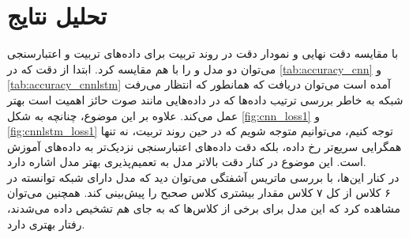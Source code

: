 \documentclass[11pt]{article}
\begin{document}
	\section{تحلیل نتایج}
	با مقایسه دقت نهایی و نمودار دقت در روند تربیت برای داده‌های تربیت و اعتبارسنجی می‌توان دو مدل  و  را با هم مقایسه کرد. ابتدا از دقت که در 
	\autoref{tab:accuracy_cnn}
	و 
	\autoref{tab:accuracy_cnnlstm}
	آمده است می‌توان دریافت که همانطور که انتظار می‌رفت شبکه 
	به خاطر بررسی ترتیب داده‌ها که در داده‌هایی مانند صوت حائز اهمیت است بهتر عمل می‌کند. علاوه بر این موضوع، چنانچه به شکل‌
	\autoref{fig:cnn_loss1}
	و 
	\autoref{fig:cnnlstm_loss1}
	توجه کنیم، می‌توانیم متوجه شویم که در حین روند تربیت، نه تنها همگرایی سریع‌تر رخ داده،‌ بلکه دقت داده‌های اعتبارسنجی نزدیک‌تر به داده‌های آموزش است. این موضوع در کنار دقت بالاتر مدل به تعمیم‌پذیری بهتر مدل 
	اشاره دارد.\\
	در کنار این‌ها، با بررسی ماتریس آشفتگی می‌توان دید که مدل دارای شبکه  توانسته در ۶ کلاس از کل ۷ کلاس مقدار بیشتری کلاس صحبح را پیش‌بینی‌ کند. همچنین می‌توان مشاهده کرد که این مدل برای برخی از کلاس‌ها که به جای هم تشخیص داده می‌شدند،‌ رفتار بهتری دارد.
\end{document}
